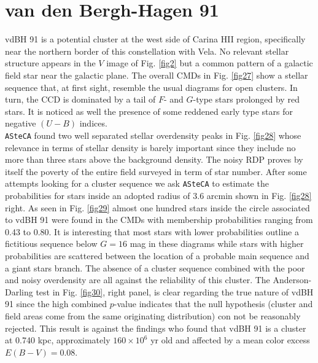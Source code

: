 \documentclass[draft]{aa}
\begin{document}
\section{van den Bergh-Hagen 91}

vdBH 91 is a potential cluster at the west side of Carina HII
region, specifically near the northern border of this constellation with Vela.
No relevant stellar structure appears in the $V$ image of Fig. \ref{fig2} but a
common pattern of a galactic field star near the galactic plane. The overall
CMDs in Fig. \ref{fig27} show a stellar sequence that, at first sight, resemble
the usual diagrams for open clusters. In turn, the CCD
is dominated by a tail of $F$- and $G$-type stars prolonged by red stars. It is
noticed as well the presence of some reddened early type stars for negative
$(U-B)$ indices.\\

\texttt{ASteCA} found two well separated stellar overdensity peaks in Fig.
\ref{fig28} whose relevance in terms of stellar density is barely important
since they include no more than three stars above the background density. The
noisy RDP proves by itself the poverty of the entire field surveyed in term of
star number. After some attempts looking for a cluster sequence we ask
\texttt{ASteCA} to estimate the probabilities for stars inside an adopted radius
of 3.6 arcmin shown in Fig. \ref{fig28} right. As seen in Fig. \ref{fig29}
almost one hundred stars inside the circle associated to vdBH 91 were
found in the CMDs with membership probabilities ranging from 0.43 to 0.80.
It is interesting that most stars with lower probabilities outline a fictitious
sequence below $G=16$ mag in these diagrams while stars with higher
probabilities are scattered between the location of a probable main sequence and
a giant stars branch. The absence of a cluster sequence combined with the
poor and noisy overdensity are all against the reliability of this cluster.
%
The Anderson-Darling test in Fig. \ref{fig30}, right panel, is clear regarding
the true nature of vdBH 91 since the high combined $p$-value
indicates that the null hypothesis (cluster and field areas come from the same
originating distribution) con not be reasonably rejected. This result is against
the \cite{Kharchenko_2005} findings who found that vdBH 91 is a cluster at
0.740 kpc, approximately $160\times10^6$ yr old and affected by a mean color
excess $E(B-V) = 0.08$.\\
\end{document}
